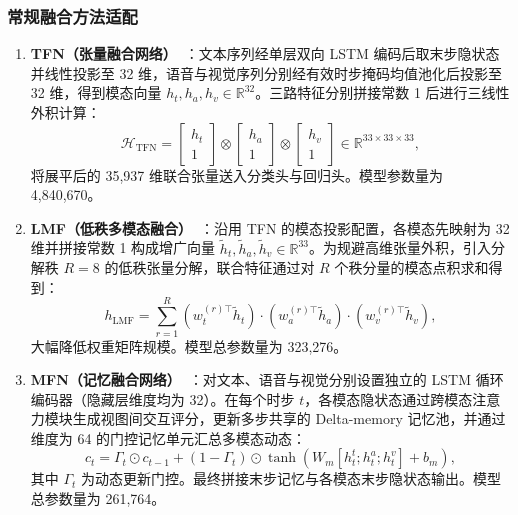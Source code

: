 \documentclass[UTF8,a4paper,11pt]{ctexart}
\begin{document}
\subsubsection{常规融合方法适配}
\begin{enumerate}[label=(\arabic*),leftmargin=2.5em,itemsep=4pt,topsep=3pt]
  \item \textbf{TFN（张量融合网络）~\cite{q2tfn}}：文本序列经单层双向 LSTM 编码后取末步隐状态并线性投影至 32 维，语音与视觉序列分别经有效时步掩码均值池化后投影至 32 维，得到模态向量 $h_t, h_a, h_v \in \mathbb{R}^{32}$。三路特征分别拼接常数 1 后进行三线性外积计算：
  \begin{equation}
    \mathcal{H}_{\text{TFN}} = \begin{bmatrix} h_t \\ 1 \end{bmatrix} \otimes \begin{bmatrix} h_a \\ 1 \end{bmatrix} \otimes \begin{bmatrix} h_v \\ 1 \end{bmatrix} \in \mathbb{R}^{33 \times 33 \times 33},
  \end{equation}
  将展平后的 35,937 维联合张量送入分类头与回归头。模型参数量为 4,840,670。

  \item \textbf{LMF（低秩多模态融合）~\cite{q2lmf}}：沿用 TFN 的模态投影配置，各模态先映射为 32 维并拼接常数 1 构成增广向量 $\tilde{h}_t, \tilde{h}_a, \tilde{h}_v \in \mathbb{R}^{33}$。为规避高维张量外积，引入分解秩 $R=8$ 的低秩张量分解，联合特征通过对 $R$ 个秩分量的模态点积求和得到：
  \begin{equation}
    h_{\text{LMF}} = \sum_{r=1}^{R} \left( w_t^{(r)\top} \tilde{h}_t \right) \cdot \left( w_a^{(r)\top} \tilde{h}_a \right) \cdot \left( w_v^{(r)\top} \tilde{h}_v \right),
  \end{equation}
  大幅降低权重矩阵规模。模型总参数量为 323,276。

  \item \textbf{MFN（记忆融合网络）~\cite{q2mfn}}：对文本、语音与视觉分别设置独立的 LSTM 循环编码器（隐藏层维度均为 32）。在每个时步 $t$，各模态隐状态通过跨模态注意力模块生成视图间交互评分，更新多步共享的 Delta-memory 记忆池，并通过维度为 64 的门控记忆单元汇总多模态动态：
  \begin{equation}
    c_t = \Gamma_t \odot c_{t-1} + (1 - \Gamma_t) \odot \tanh(W_m [h_t^t; h_t^a; h_t^v] + b_m),
  \end{equation}
  其中 $\Gamma_t$ 为动态更新门控。最终拼接末步记忆与各模态末步隐状态输出。模型总参数量为 261,764。


\end{enumerate}
\end{document}
